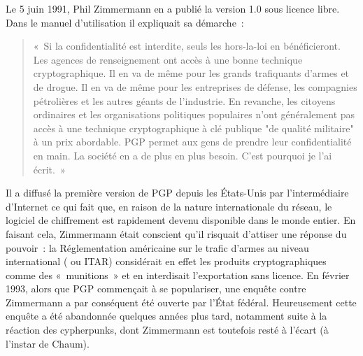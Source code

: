 Le 5 juin 1991, Phil Zimmermann en a publié la version 1.0 sous licence libre. Dans le manuel d'utilisation il expliquait sa démarche~:

\begin{quote}
«~Si la confidentialité est interdite, seuls les hors-la-loi en bénéficieront. Les agences de renseignement ont accès à une bonne technique cryptographique. Il en va de même pour les grands trafiquants d'armes et de drogue. Il en va de même pour les entreprises de défense, les compagnies pétrolières et les autres géants de l'industrie. En revanche, les citoyens ordinaires et les organisations politiques populaires n'ont généralement pas accès à une technique cryptographique à clé publique "de qualité militaire" à un prix abordable. PGP permet aux gens de prendre leur confidentialité en main. La société en a de plus en plus besoin. C'est pourquoi je l'ai écrit.~»
\end{quote} %


Il a diffusé la première version de PGP depuis les États-Unis par l'intermédiaire d'Internet ce qui fait que, en raison de la nature internationale du réseau, le logiciel de chiffrement est rapidement devenu disponible dans le monde entier. En faisant cela, Zimmermann était conscient qu'il risquait d'attiser une réponse du pouvoir~: la Réglementation américaine sur le trafic d'armes au niveau international ( ou ITAR) considérait en effet les produits cryptographiques comme des «~munitions~» et en interdisait l'exportation sans licence. En février 1993, alors que PGP commençait à se populariser, une enquête contre Zimmermann a par conséquent été ouverte par l'État fédéral. Heureusement cette enquête a été abandonnée quelques années plus tard, notamment suite à la réaction des cypherpunks, dont Zimmermann est toutefois resté à l'écart (à l'instar de Chaum). %

